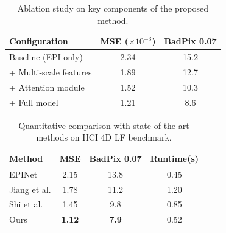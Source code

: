 \documentclass[lettersize,journal]{IEEEtran}
\begin{document}



\begin{table}[t]
\centering
\caption{Ablation study on key components of the proposed method.}
\label{tab:ablation}
\begin{tabular}{lcc}
\toprule
Configuration & MSE ($\times 10^{-3}$) & BadPix 0.07 \\
\midrule
Baseline (EPI only) & 2.34 & 15.2\\
+ Multi-scale features & 1.89 & 12.7 \\
+ Attention module & 1.52 & 10.3 \\
+ Full model & 1.21 & 8.6 \\
\bottomrule
\end{tabular}
\end{table}

\begin{table}[t]
\centering
\caption{Quantitative comparison with state-of-the-art methods on HCI 4D LF benchmark.}
\label{tab:sota}
\begin{tabular}{lccc}
\toprule
Method & MSE & BadPix 0.07 & Runtime(s) \\
\midrule
EPINet~\cite{heber2018} & 2.15 & 13.8 & 0.45 \\
Jiang et al. & 1.78 & 11.2 & 1.20 \\
Shi et al. & 1.45 & 9.8 & 0.85 \\
Ours & \textbf{1.12} & \textbf{7.9} & 0.52 \\
\bottomrule
\end{tabular}
\end{table}
\end{document}
